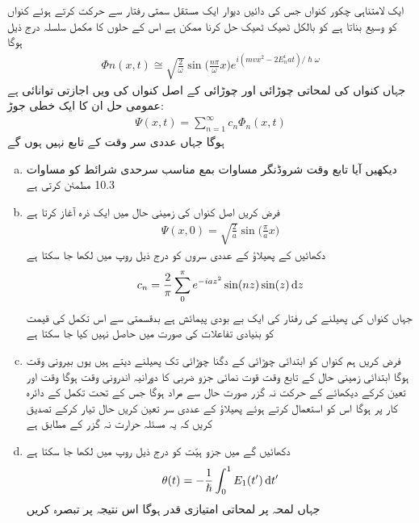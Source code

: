 ایک لامتناہی چکور کنواں جس کی دائیں دیوار ایک مستقل سمتی رفتار  سے حرکت کرتے ہوئے کنواں کو وسیع بناتا ہے کو بالکل ٹھیک ٹھیک حل کرنا ممکن ہے اس کے حلوں کا مکمل سلسلہ درج ذیل ہوگا 
\begin{align}
\Phi n (x, t) \cong \sqrt{\frac{2}{\omega}} \sin \big ( \frac{n \pi}{\omega} x \big ) e^{i(mvx^2 -2E_n^i at)/\hslash \omega}
\end{align}
جہاں  کنواں کی لمحاتی چوڑائی اور چوڑائی  کے اصل کنواں کی  ویں اجازتی توانائی  ہے عمومی حل ان  کا ایک خطی جوڑ:
\begin{align}
\Psi (x, t) = \sum_{n = 1}^{\infty} c_n \Phi_n (x, t)
\end{align}
ہوگا جہاں عددی سر  وقت  کے تابع نہیں ہوں گے 
\begin{enumerate}[a.]
\item
دیکھیں آیا تابع وقت شروڈنگر مساوات بمع مناسب سرحدی شرائط کو مساوات 10.3  مطمئن کرتی ہے 
\item
فرض کریں اصل کنواں کی زمینی حال میں ایک ذرہ آغاز   کرتا ہے  
\begin{align*}
\Psi (x, 0) = \sqrt{\frac{2}{a}} \sin \big ( \frac{\pi}{a} x \big )
\end{align*}
دکھائیں کے پھیلاؤ کے عددى سروں کو درج ذیل روپ میں لکھا جا سکتا ہے 
\begin{align}
c_n = \frac{2}{\pi} \sum_0^{\pi} e^{-iaz^2} \sin(nz) \sin(z) \dif z
\end{align}
جہاں 
کنواں کی پھیلنے کی رفتار کی ایک بے بودی پیمائش ہے بدقسمتی سے اس تکمل کی قیمت کو بنیادی تفاعلات کی صورت میں حاصل نہیں کیا جا سکتا ہے 
\item
فرض کریں ہم کنواں کو ابتدائی چوڑائی کے دگنا چوڑائی تک پھیلنے دیتے ہیں یوں بیرونی وقت  ہوگا ابتدائی زمینی حال کے تابع وقت قوت نمائی جزو ضربی کا دورانیہ اندرونی وقت ہوگا وقت  اور  تعین کرکے دیکھائے کے حرکت نہ گزر صورت حال سے مراد  ہوگا جس کے تحت تکمل کے دائرہ کار پر  ہوگا اس کو استعمال کرتے ہوئے پھیلاؤ کے عددی سر  تعین کریں حال  تیار کرکے تصدیق کریں کہ یہ مسئلہ حرارت نہ گزر کے مطابق ہے 
\item
دکھائیں گے  میں جزو ہيّت کو درج ذیل روپ میں لکھا جا سکتا ہے 
\begin{align}
\theta (t) = - \frac{1}{\hslash} \int_0^1 E_1 (t') \dif t'
\end{align}
جہاں لمحہ  پر لمحاتی امتیازی قدر  ہوگا اس نتیجہ پر تبصرہ کریں 
\end{enumerate}
